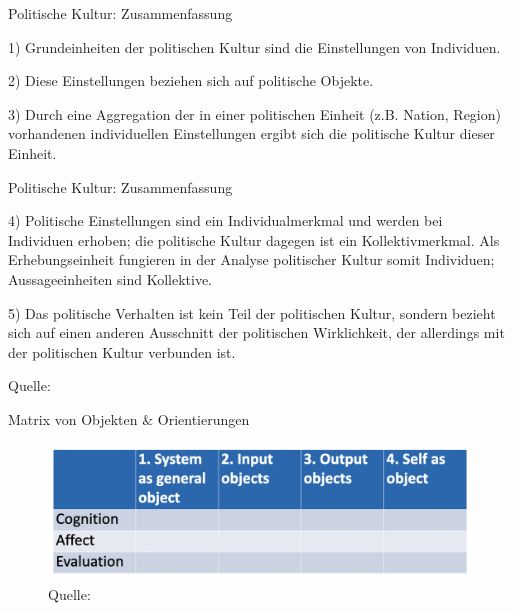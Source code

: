 \documentclass[11pt]{beamer}
\begin{document}

\begin{frame}[t]{Politische Kultur: Zusammenfassung}
	\begin{nolist}
		\item[1)] Grundeinheiten der politischen Kultur sind die Einstellungen von Individuen.
		\item[2)] Diese Einstellungen beziehen sich auf politische Objekte.
		\item[3)] Durch eine Aggregation der in einer politischen Einheit (z.B. Nation, Region) vorhandenen individuellen Einstellungen ergibt sich die politische Kultur dieser Einheit.
	\end{nolist}
\end{frame}

\begin{frame}[t]{Politische Kultur: Zusammenfassung}
	\begin{nolist}
		\item[4)] Politische Einstellungen sind ein Individualmerkmal und werden bei Individuen erhoben; die politische Kultur dagegen ist ein Kollektivmerkmal. Als Erhebungseinheit fungieren in der Analyse politischer Kultur somit Individuen; Aussageeinheiten sind Kollektive.
		\item[5)] Das politische Verhalten ist kein Teil der politischen Kultur, sondern bezieht sich auf einen anderen Ausschnitt der politischen Wirklichkeit, der allerdings mit der politischen Kultur verbunden ist.
	\end{nolist}
	
	Quelle: \cite[402]{Gabriel2009}
\end{frame}


\begin{frame}[t]{Matrix von Objekten \& Orientierungen}
	\begin{figure}[ht]
		\includegraphics[width=\textwidth]{pics/s3-3.png}
		\caption{Quelle: \cite[16]{Almond1963}}
	\end{figure}

\end{frame}
\end{document}
